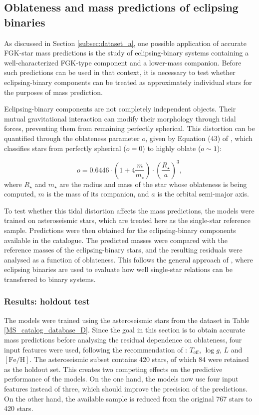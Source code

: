 \subsection{Oblateness and mass predictions of eclipsing binaries} \label{sec:dataset_C}
As discussed in Section \ref{subsec:dataset_a}, one possible application of accurate FGK-star mass predictions is the study of eclipsing-binary systems containing a well-characterized FGK-type component and a lower-mass companion. Before such predictions can be used in that context, it is necessary to test whether eclipsing-binary components can be treated as approximately individual stars for the purposes of mass prediction.

Eclipsing-binary components are not completely independent objects. Their mutual gravitational interaction can modify their morphology through tidal forces, preventing them from remaining perfectly spherical. This distortion can be quantified through the oblateness parameter $o$, given by Equation (43) of \citet{chandrasekhar1933double}, which classifies stars from perfectly spherical ($o=0$) to highly oblate ($o \sim 1$):

\begin{equation}
o = 0.6446 \cdot \left(1 + 4\frac{m}{m_\star}\right) \cdot \left(\frac{R_\star}{a}\right)^3,
\label{eq:oblateness}
\end{equation}
where $R_\star$ and $m_\star$ are the radius and mass of the star whose oblateness is being computed, $m$ is the mass of its companion, and $a$ is the orbital semi-major axis.

To test whether this tidal distortion affects the mass predictions, the models were trained on asteroseismic stars, which are treated here as the single-star reference sample. Predictions were then obtained for the eclipsing-binary components available in the catalogue. The predicted masses were compared with the reference masses of the eclipsing-binary stars, and the resulting residuals were analysed as a function of oblateness. This follows the general approach of \citet{maxted2023benchmark}, where eclipsing binaries are used to evaluate how well single-star relations can be transferred to binary systems.

\subsubsection*{Results: holdout test}
The models were trained using the asteroseismic stars from the dataset in Table \ref{MS_catalog_database_D}. Since the goal in this section is to obtain accurate mass predictions before analysing the residual dependence on oblateness, four input features were used, following the recommendation of \citet{moya2022}: $T_{\mathrm{eff}}$, $\log g$, $L$ and $[\mathrm{Fe}/\mathrm{H}]$. The asteroseismic subset contains 420 stars, of which 84 were retained as the holdout set. This creates two competing effects on the predictive performance of the models. On the one hand, the models now use four input features instead of three, which should improve the precision of the predictions. On the other hand, the available sample is reduced from the original 767 stars to 420 stars. 


